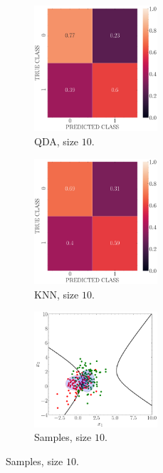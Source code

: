\documentclass[12pt, a4 paper]{article}
\begin{document}
\begin{figure}[!htbp]
\centering
\quad \quad
    \begin{subfigure}[!htbp]{0.24\textwidth}
       \centering
       \includegraphics[width=1.8in]{../results/ex1/conf_mtx_QD_ML_dataset_P1a_size_10.pdf}
       \caption{QDA, size $10$.}
       \label{fig:QDA_P1a_10}
    \end{subfigure}
\quad \quad
    \begin{subfigure}[!htbp]{0.24\textwidth}
       \centering
       \includegraphics[width=1.8in]{../results/ex1/conf_mtx_KNN_dataset_P1a_size_10.pdf}
       \caption{KNN, size $10$.}
       \label{fig:KNN_P1a_10}
    \end{subfigure}
\quad \quad
    \begin{subfigure}[!htbp]{0.24\textwidth}
       \centering
       \includegraphics[width=1.8in]{../results/ex1/samples_QD_ML_dataset_P1a_size_10.pdf}
       \caption{Samples, size $10$.}
       \label{fig:DF_P1a_10}
    \end{subfigure}
    

\end{figure}
\end{document}

